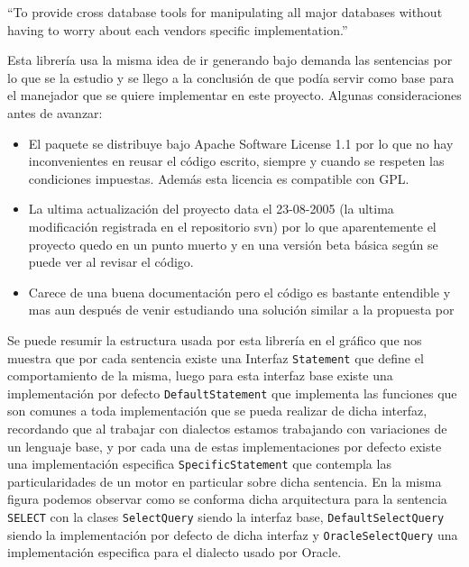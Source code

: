 \begin{center}
``To provide cross database tools for manipulating all major databases without having to worry about each vendors specific implementation.''
\end{center} 

Esta librería  usa la misma idea de ir generando bajo demanda las sentencias por lo que se la estudio y se llego a la conclusión de que podía servir como base para el manejador que se quiere implementar en este proyecto. Algunas consideraciones antes de avanzar:
\begin{itemize}
\item El paquete se distribuye bajo Apache Software License 1.1 por lo que no hay inconvenientes en reusar el código escrito, siempre y cuando se respeten las condiciones impuestas. Además esta licencia es compatible con GPL.
\item La ultima actualización del proyecto data el 23-08-2005 (la ultima modificación registrada en el repositorio svn) por lo que aparentemente el proyecto quedo en un punto muerto y en una versión beta básica según se puede ver al revisar el código.
\item Carece de una buena documentación pero el código es bastante entendible y mas aun después de venir estudiando una solución similar a la propuesta por \cc


\end{itemize}
Se puede resumir la estructura usada por esta librería en el gráfico  que nos muestra que por cada sentencia existe una Interfaz \verb=Statement= que define el comportamiento de la misma, luego para esta interfaz base existe una implementación por defecto \verb=DefaultStatement= que implementa las funciones que son comunes a toda implementación que se pueda realizar de dicha interfaz, recordando que al trabajar con dialectos estamos trabajando con variaciones de un lenguaje base, y por cada una de estas implementaciones por defecto existe una implementación especifica \verb=SpecificStatement= que contempla las particularidades de un motor en particular sobre dicha sentencia. En la misma figura podemos observar como se conforma dicha arquitectura para la sentencia \verb=SELECT= con la clases \verb=SelectQuery= siendo la interfaz base, \verb=DefaultSelectQuery= siendo la implementación por defecto de dicha interfaz y \verb=OracleSelectQuery= una implementación especifica para el dialecto usado por Oracle.


